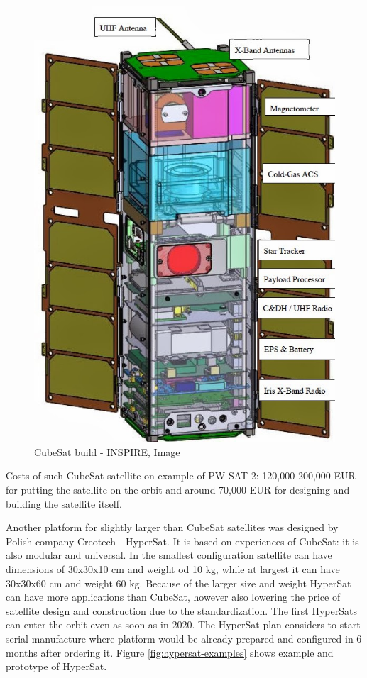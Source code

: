 \documentclass[12pt,a4paper,twoside]{article}
\begin{document}
\begin{figure}[!htbp]
\includegraphics[scale=0.45]{INSPIRE_JPL.jpg}
\centering
\caption[CubeSat build - INSPIRE]{CubeSat build - INSPIRE, Image\cite{cubesat-build}}
\label{fig:cubesat-build}
\end{figure}

Costs of such CubeSat satellite on example of PW-SAT 2: 120,000-200,000 EUR for putting the satellite on the orbit and around 70,000 EUR for designing and building the satellite itself\cite{pw-pw-sat2}.

Another platform for slightly larger than CubeSat satellites was designed by Polish company Creotech - HyperSat\cite{hypersat}. It is based on experiences of CubeSat: it is also modular and universal. In the smallest configuration satellite can have dimensions of 30x30x10 cm and weight od 10 kg, while at largest it can have 30x30x60 cm and weight 60 kg. Because of the larger size and weight HyperSat can have more applications than CubeSat, however also lowering the price of satellite design and construction due to the standardization. The first HyperSats can enter the orbit even as soon as in 2020\cite{hypersat-space24}. The HyperSat plan considers to start serial manufacture where platform would be already prepared and configured in 6 months after ordering it\cite{platforma-satelitarna-space24}. Figure \ref{fig:hypersat-examples} shows example and prototype of HyperSat.
\end{document}
